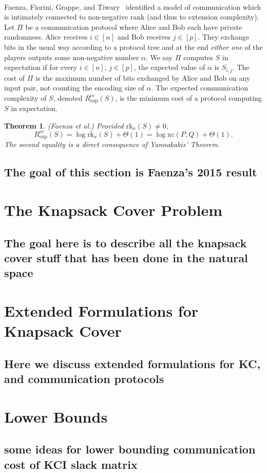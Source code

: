\documentclass[letterpaper,12pt,oneside,onecolumn]{article}
\newtheorem{theorem}[fact]{Theorem}
\begin{document}
\paragraph{}
Faenza, Fiorini, Grappe, and Tiwary~\cite{faenza2015extended} identified a model of communication which is intimately connected to non-negative rank (and thus to extension complexity). Let $\Pi$ be a communication protocol where Alice and Bob each have private randomness. Alice receives $i \in [n]$ and Bob receives $j \in [p]$. They exchange bits in the usual way according to a protocol tree and at the end \emph{either one} of the players outputs some non-negative number $\alpha$. We say $\Pi$ computes $S$ in expectation if for every $i \in [n]$, $j \in [p]$, the expected value of $\alpha$ is $S_{i,j}$. The cost of $\Pi$ is the maximum number of bits exchanged by Alice and Bob on any input pair, not counting the encoding size of $\alpha$. The expected communication complexity of $S$, denoted $R^\text{cc}_{\text{exp}}(S)$, is the minimum cost of a protocol computing $S$ in expectation.
\begin{theorem}(Faenza et al.) Provided $\text{rk}_x(S) \neq 0$, $$R^\text{cc}_{\text{exp}}(S) = \log \text{rk}_x(S) + \Theta(1) = \log\text{xc}(P,Q) + \Theta(1).$$
The second equality is a direct consequence of Yannakakis' Theorem. 
\end{theorem}
\subsection{The goal of this section is Faenza's 2015 result}
\section{The Knapsack Cover Problem}
\subsection{The goal here is to describe all the knapsack cover stuff that has been done in the natural space}
\section{Extended Formulations for Knapsack Cover}
\subsection{Here we discuss extended formulations for KC, and communication protocols}
\section{Lower Bounds}
\subsection{some ideas for lower bounding communication cost of KCI slack matrix}



\end{document}
